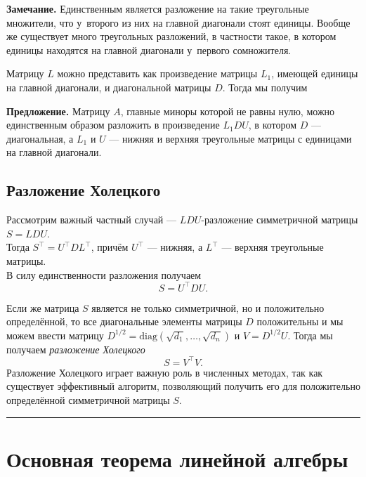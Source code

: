 \documentclass[11pt,a4paper]{article}
\begin{document}
\textbf{Замечание.} Единственным является разложение на такие
треугольные множители, что у~второго из них на главной диагонали стоят
единицы. Вообще же существует много треугольных разложений, в частности
такое, в котором единицы находятся на главной диагонали у~первого
сомножителя.

Матрицу \(L\) можно представить как произведение матрицы \(L_1\),
имеющей единицы на главной диагонали, и диагональной матрицы \(D\).
Тогда мы получим

\textbf{Предложение.} Матрицу \(A\), главные миноры которой не равны
нулю, можно единственным образом разложить в произведение \(L_1 D U\), в
котором \(D\) --- диагональная, а \(L_1\) и \(U\) --- нижняя и верхняя
треугольные матрицы с единицами на главной диагонали.

    \hypertarget{ux440ux430ux437ux43bux43eux436ux435ux43dux438ux435-ux445ux43eux43bux435ux446ux43aux43eux433ux43e}{%
\subsection{Разложение
Холецкого}\label{ux440ux430ux437ux43bux43eux436ux435ux43dux438ux435-ux445ux43eux43bux435ux446ux43aux43eux433ux43e}}

Рассмотрим важный частный случай --- \(LDU\)-разложение симметричной
матрицы \(S = LDU\).\\
Тогда \(S^\top = U^\top D L^\top\), причём \(U^\top\) --- нижняя, а
\(L^\top\) --- верхняя треугольные матрицы.\\
В силу единственности разложения получаем \[ S = U^\top D U. \]

Если же матрица \(S\) является не только симметричной, но и положительно
определённой, то все диагональные элементы матрицы \(D\) положительны и
мы можем ввести матрицу
\(D^{1/2} = \mathrm{diag}\left(\sqrt{d_1}, \dots, \sqrt{d_n}\right)\) и
\(V = D^{1/2}U\).
Тогда мы получаем \emph{разложение Холецкого} \[
  S = V^\top V.
\]
Разложение Холецкого играет важную роль в численных методах, так
как существует эффективный алгоритм, позволяющий получить его для
положительно определённой симметричной матрицы \(S\).

    \begin{center}\rule{0.5\linewidth}{0.5pt}\end{center}

    \hypertarget{ux43eux441ux43dux43eux432ux43dux430ux44f-ux442ux435ux43eux440ux435ux43cux430-ux43bux438ux43dux435ux439ux43dux43eux439-ux430ux43bux433ux435ux431ux440ux44b}{%
\section{Основная теорема линейной
алгебры}\label{ux43eux441ux43dux43eux432ux43dux430ux44f-ux442ux435ux43eux440ux435ux43cux430-ux43bux438ux43dux435ux439ux43dux43eux439-ux430ux43bux433ux435ux431ux440ux44b}}
\end{document}
